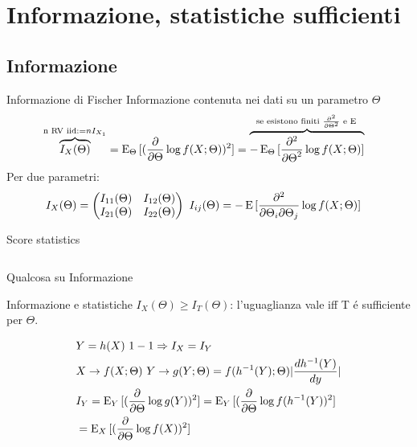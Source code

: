 \documentclass[asd-beamer.tex]{subfiles}
\begin{document}
\section{Informazione, statistiche sufficienti}

\subsection{Informazione}

\begin{frame}{Informazione di Fischer}
Informazione contenuta nei dati su un parametro $\Theta$
\begin{align*}
&\overbrace{I_X(\Theta)}^{\text{n RV iid:}=nI_{X_1}}=\E_{\Theta}{[(\PDof{\Theta}\log{f(X;\Theta}))^2]}=\overbrace{-\E_{\Theta}{[\PtwoDof{\Theta}\log{f(X;\Theta)}]}}^{\text{se esistono finiti $\PtwoDof{\Theta}$ e $\E{}$}}
\end{align*}
Per due parametri:
\begin{align*}
&I_X(\Theta)=\begin{pmatrix}I_{11}(\Theta)&I_{12}(\Theta)\\I_{21}(\Theta)&I_{22}(\Theta)\end{pmatrix}\ I_{ij}(\Theta)=-\E{[\frac{\partial^2}{\partial\Theta_i\partial\Theta_j}\log{f(X;\Theta)}]}
\end{align*}
\begin{block}{Score statistics}
	\begin{columns}[T]\begin{column}{0.5\textwidth}
			
		\end{column}\begin{column}{0.5\textwidth}
			
	\end{column}\end{columns}
\end{block}
\end{frame}

\begin{frame}{Qualcosa su Informazione}
\begin{block}{Informazione e statistiche}
$I_X(\Theta)\geq I_T(\Theta)$: l'uguaglianza vale iff T \'e sufficiente per $\Theta$.
\end{block}
\begin{align*}
&Y=h(X)\ 1-1 \Rightarrow I_X=I_Y\\
&X\to f(X;\Theta)\ Y\to g(Y;\Theta)=f(\invers{h}(Y);\Theta)|\TDy{y}{\invers{h}(Y)}|\\
&I_Y=\E_Y{[(\PDof{\Theta}\log{g(Y)})^2]}=\E_Y{[(\PDof{\Theta}\log{f(\invers{h}(Y)})^2]}\\
&=\E_X{[(\PDof{\Theta}\log{f(X)})^2]}
\end{align*}
\end{frame}
\end{document}
